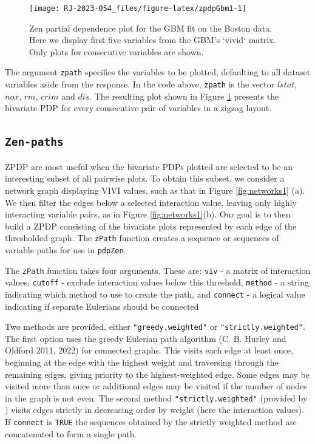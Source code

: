 \begin{figure}

{\centering \texttt{[image: RJ-2023-054\_files/figure-latex/zpdpGbm1-1]} 

}

\caption{Zen partial dependence plot for the GBM fit on the Boston data. Here we display first five variables from the GBM's `vivid` matrix. Only plots for consecutive variables are shown.}\label{fig:zpdpGbm1}
\end{figure}

The argument \texttt{zpath} specifies the variables to be plotted, defaulting to all dataset variables aside from the response. In the code above, \texttt{zpath} is the vector \(lstat\), \(nox\), \(rm\), \(crim\) and \(dis\). The resulting plot shown in Figure \ref{fig:zpdpGbm1} presents the bivariate PDP for every consecutive pair of variables in a zigzag layout.

\hypertarget{sec:zp}{%
\subsection{\texorpdfstring{\texttt{Zen-paths}}{Zen-paths}}\label{sec:zp}}

ZPDP are most useful when the bivariate PDPs plotted are selected to be an interesting subset of all pairwise plots. To obtain this subset, we consider a network graph displaying VIVI values, such as that in Figure \ref{fig:networks1} (a). We then filter the edges below a selected interaction value, leaving only highly interacting variable pairs, as in Figure \ref{fig:networks1}(b). Our goal is to then build a ZPDP consisting of the bivariate plots represented by each edge of the thresholded graph. The \texttt{zPath} function creates a sequence or sequences of variable paths for use in \texttt{pdpZen}.

The \texttt{zPath} function takes four arguments. These are:
\texttt{viv} - a matrix of interaction values,
\texttt{cutoff} - exclude interaction values below this threshold,
\texttt{method} - a string indicating which method to use to create the path, and
\texttt{connect} - a logical value indicating if separate Eulerians should be connected

Two methods are provided, either \texttt{"greedy.weighted"} or \texttt{"strictly.weighted"}. The first option uses the greedy Eulerian path algorithm (C. B. Hurley and Oldford 2011, 2022) for connected graphs. This visits each edge at least once, beginning at the edge with the highest weight and traversing through the remaining edges, giving priority to the highest-weighted edge. Some edges may be visited more than once or additional edges may be visited if the number of nodes in the graph is not even. The second method \texttt{"strictly.weighted"} (provided by ) visits edges strictly in decreasing order by weight (here the interaction values). If \texttt{connect} is \texttt{TRUE} the sequences obtained by the strictly weighted method are concatenated to form a single path.

